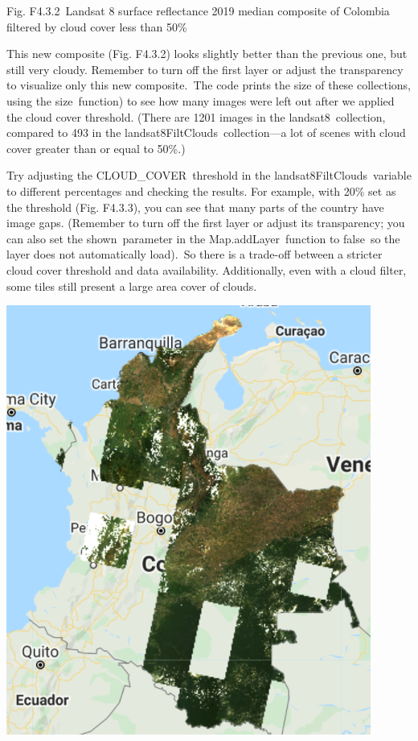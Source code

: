 \documentclass[
  letterpaper,
  DIV=11,
  numbers=noendperiod]{scrreprt}
\begin{document}
Fig. F4.3.2~Landsat 8 surface reflectance 2019 median composite of
Colombia filtered by cloud cover less than 50\%

This new composite (Fig. F4.3.2) looks slightly better than the previous
one, but still very cloudy. Remember to turn off the first layer or
adjust the transparency to visualize only this new composite.~The code
prints the size of these collections, using the size~function) to see
how many images were left out after we applied the cloud cover
threshold. (There are 1201 images in the landsat8~collection, compared
to 493 in the landsat8FiltClouds~collection---a lot of scenes with cloud
cover greater than or equal to 50\%.)

Try adjusting the CLOUD\_COVER~threshold in the
landsat8FiltClouds~variable to different percentages and checking the
results. For example, with 20\% set as the threshold (Fig. F4.3.3), you
can see that many parts of the country have image gaps. (Remember to
turn off the first layer or adjust its transparency; you can also set
the shown~parameter in the Map.addLayer~function to false~so the layer
does not automatically load).~So there is a trade-off between a stricter
cloud cover threshold and data availability. Additionally, even with a
cloud filter, some tiles still present a large area cover of clouds.

\includegraphics{./F4/image42.png}
\end{document}
